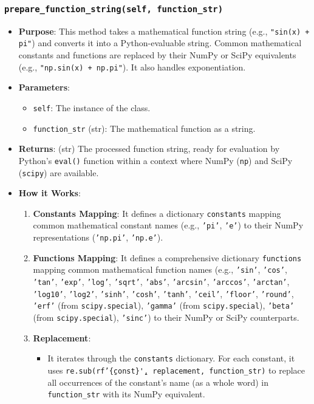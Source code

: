 \documentclass[12pt,a4paper]{report}
\begin{document}
\subsubsection{\texttt{prepare\_function\_string(self, function\_str)}}
\begin{itemize}
    \item \textbf{Purpose}: This method takes a mathematical function string (e.g., \texttt{"sin(x) + pi"}) and converts it into a Python-evaluable string. Common mathematical constants and functions are replaced by their NumPy or SciPy equivalents (e.g., \texttt{"np.sin(x) + np.pi"}). It also handles exponentiation.
    \item \textbf{Parameters}:
        \begin{itemize}
            \item \texttt{self}: The instance of the class.
            \item \texttt{function\_str} (str): The mathematical function as a string.
        \end{itemize}
    \item \textbf{Returns}: (str) The processed function string, ready for evaluation by Python's \texttt{eval()} function within a context where NumPy (\texttt{np}) and SciPy (\texttt{scipy}) are available.
    \item \textbf{How it Works}:
        \begin{enumerate}
            \item \textbf{Constants Mapping}: It defines a dictionary \texttt{constants} mapping common mathematical constant names (e.g., \texttt{'pi'}, \texttt{'e'}) to their NumPy representations (\texttt{'np.pi'}, \texttt{'np.e'}).
            \item \textbf{Functions Mapping}: It defines a comprehensive dictionary \texttt{functions} mapping common mathematical function names (e.g., \texttt{'sin'}, \texttt{'cos'}, \texttt{'tan'}, \texttt{'exp'}, \texttt{'log'}, \texttt{'sqrt'}, \texttt{'abs'}, \texttt{'arcsin'}, \texttt{'arccos'}, \texttt{'arctan'}, \texttt{'log10'}, \texttt{'log2'}, \texttt{'sinh'}, \texttt{'cosh'}, \texttt{'tanh'}, \texttt{'ceil'}, \texttt{'floor'}, \texttt{'round'}, \texttt{'erf'} (from \texttt{scipy.special}), \texttt{'gamma'} (from \texttt{scipy.special}), \texttt{'beta'} (from \texttt{scipy.special}), \texttt{'sinc'}) to their NumPy or SciPy counterparts.
            \item \textbf{Replacement}:
                \begin{itemize}
                    \item It iterates through the \texttt{constants} dictionary. For each constant, it uses \texttt{re.sub(rf'\b\{const\}\b', replacement, function\_str)} to replace all occurrences of the constant's name (as a whole word) in \texttt{function\_str} with its NumPy equivalent.

\end{itemize}
\end{enumerate}
\end{itemize}
\end{document}
